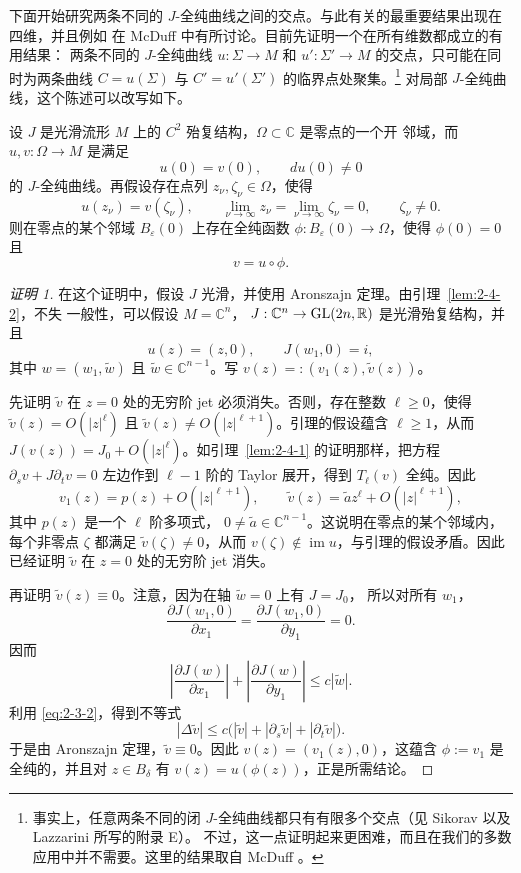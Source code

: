 下面开始研究两条不同的 $J$-全纯曲线之间的交点。与此有关的最重要结果出现在四维，并且例如
在 McDuff  中有所讨论。目前先证明一个在所有维数都成立的有用结果：
两条不同的
$J$-全纯曲线 $u:\Sigma\to M$ 和 $u':\Sigma'\to M$ 的交点，只可能在同时为两条曲线
$C=u(\Sigma)$ 与 $C'=u'(\Sigma')$ 的临界点处聚集。\footnote{事实上，任意两条不同的闭
$J$-全纯曲线都只有有限多个交点（见 Sikorav  以及 Lazzarini 所写的附录 E）。
不过，这一点证明起来更困难，而且在我们的多数应用中并不需要。这里的结果取自 McDuff
。} 对局部 $J$-全纯曲线，这个陈述可以改写如下。

\begin{lemma}\label{lem:2-4-3}
设 $J$ 是光滑流形 $M$ 上的 $C^2$ 殆复结构，$\Omega\subset\mathbb C$ 是零点的一个开
邻域，而 $u,v:\Omega\to M$ 是满足
\[
  u(0)=v(0),\qquad du(0)\ne0
\]
的 $J$-全纯曲线。再假设存在点列 $z_\nu,\zeta_\nu\in\Omega$，使得
\[
  u(z_\nu)=v(\zeta_\nu),\qquad
  \lim_{\nu\to\infty}z_\nu
  =\lim_{\nu\to\infty}\zeta_\nu=0,
  \qquad \zeta_\nu\ne0.
\]
则在零点的某个邻域 $B_\varepsilon(0)$ 上存在全纯函数
$\phi:B_\varepsilon(0)\to\Omega$，使得 $\phi(0)=0$ 且
\[
  v=u\circ\phi.
\]
\end{lemma}

\begin{proof}[证明 1]
在这个证明中，假设 $J$ 光滑，并使用 Aronszajn 定理。由引理~\ref{lem:2-4-2}，不失
一般性，可以假设 $M=\mathbb C^n$，
$J:\mathbb C^n\to\operatorname{GL}(2n,\mathbb R)$ 是光滑殆复结构，并且
\[
  u(z)=(z,0),\qquad J(w_1,0)=i,
\]
其中 $w=(w_1,\widetilde w)$ 且 $\widetilde w\in\mathbb C^{n-1}$。写
$v(z)=:(v_1(z),\widetilde v(z))$。

先证明 $\widetilde v$ 在 $z=0$ 处的无穷阶 jet 必须消失。否则，存在整数
$\ell\ge0$，使得
$\widetilde v(z)=O(|z|^\ell)$ 且
$\widetilde v(z)\ne O(|z|^{\ell+1})$。引理的假设蕴含 $\ell\ge1$，从而
$J(v(z))=J_0+O(|z|^\ell)$。如引理~\ref{lem:2-4-1} 的证明那样，把方程
$\partial_sv+J\partial_tv=0$ 左边作到 $\ell-1$ 阶的 Taylor 展开，得到
$T_\ell(v)$ 全纯。因此
\[
  v_1(z)=p(z)+O(|z|^{\ell+1}),\qquad
  \widetilde v(z)=\widetilde a z^\ell+O(|z|^{\ell+1}),
\]
其中 $p(z)$ 是一个 $\ell$ 阶多项式，
$0\ne\widetilde a\in\mathbb C^{n-1}$。这说明在零点的某个邻域内，每个非零点
$\zeta$ 都满足 $\widetilde v(\zeta)\ne0$，从而
$v(\zeta)\notin\operatorname{im}u$，与引理的假设矛盾。因此已经证明
$\widetilde v$ 在 $z=0$ 处的无穷阶 jet 消失。

再证明 $\widetilde v(z)\equiv0$。注意，因为在轴 $\widetilde w=0$ 上有 $J=J_0$，
所以对所有 $w_1$，
\[
  \frac{\partial J(w_1,0)}{\partial x_1}
  =\frac{\partial J(w_1,0)}{\partial y_1}=0.
\]
因而
\[
  \left|\frac{\partial J(w)}{\partial x_1}\right|
  +\left|\frac{\partial J(w)}{\partial y_1}\right|
  \le c|\widetilde w|.
\]
利用 \eqref{eq:2-3-2}，得到不等式
\[
  |\Delta\widetilde v|
  \le c\bigl(|\widetilde v|+|\partial_s\widetilde v|
  +|\partial_t\widetilde v|\bigr).
\]
于是由 Aronszajn 定理，$\widetilde v\equiv0$。因此
$v(z)=(v_1(z),0)$，这蕴含 $\phi:=v_1$ 是全纯的，并且对 $z\in B_\delta$ 有
$v(z)=u(\phi(z))$，正是所需结论。
\end{proof}

